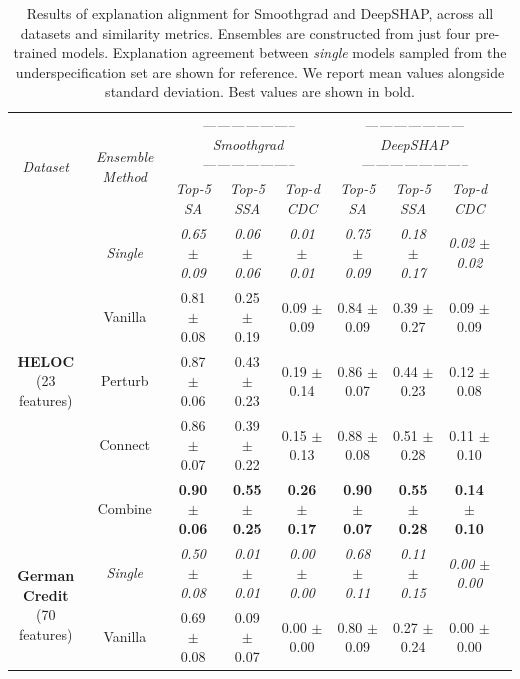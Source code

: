 \begin{table}[t]
\caption{\small Results of explanation alignment for Smoothgrad and DeepSHAP, across all datasets and similarity metrics. Ensembles are constructed from just four pre-trained models. Explanation agreement between \textit{single} models sampled from the underspecification set are shown for reference. We report mean values alongside standard deviation. Best values are shown in bold.}
\label{tab:all_res}
\centering
\fontsize{8}{7}\selectfont
\begin{tabular}{ccccccccc}\toprule
\multirow{2}{*}{\textit{Dataset}} & \multirow{2}{*}{\parbox{0.08\textwidth}{\centering\textit{Ensemble Method}}} & \multicolumn{3}{c}{\textit{-------------------- Smoothgrad --------------------}} & \multicolumn{3}{c}{\textit{--------------------- DeepSHAP -----------------------}} \\
& & \textit{Top-5 SA} & \textit{Top-5 SSA} & \textit{Top-d CDC} & \textit{Top-5 SA} & \textit{Top-5 SSA} & \textit{Top-d CDC} \\\midrule
\multirow{5}{*}{\parbox{0.09\textwidth}{\centering\textbf{HELOC}\\ \scriptsize (23 features)}}
    & \textit{Single} & \textit{0.65 $\pm$ 0.09} & \textit{0.06 $\pm$ 0.06} & \textit{0.01 $\pm$ 0.01} & \textit{0.75 $\pm$ 0.09} & \textit{0.18 $\pm$ 0.17} & \textit{0.02 $\pm$ 0.02} \\
    & Vanilla & 0.81 $\pm$ 0.08 & 0.25 $\pm$ 0.19 & 0.09 $\pm$ 0.09 & 0.84 $\pm$ 0.09 & 0.39 $\pm$ 0.27 & 0.09 $\pm$ 0.09 \\
    & Perturb & 0.87 $\pm$ 0.06 & 0.43 $\pm$ 0.23 & 0.19 $\pm$ 0.14 & 0.86 $\pm$ 0.07 & 0.44 $\pm$ 0.23 & 0.12 $\pm$ 0.08 \\
    & Connect & 0.86 $\pm$ 0.07 & 0.39 $\pm$ 0.22 & 0.15 $\pm$ 0.13 & 0.88 $\pm$ 0.08 & 0.51 $\pm$ 0.28 & 0.11 $\pm$ 0.10 \\
    & Combine & \textbf{0.90 $\pm$ 0.06} & \textbf{0.55 $\pm$ 0.25} & \textbf{0.26 $\pm$ 0.17} & \textbf{0.90 $\pm$ 0.07} & \textbf{0.55 $\pm$ 0.28} & \textbf{0.14 $\pm$ 0.10} \\ \midrule
\multirow{5}{*}{\parbox{0.09\textwidth}{\centering\textbf{German\\Credit}\\ \scriptsize (70 features)}}
    & \textit{Single} & \textit{0.50 $\pm$ 0.08} & \textit{0.01 $\pm$ 0.01} & \textit{0.00 $\pm$ 0.00} & \textit{0.68 $\pm$ 0.11} & \textit{0.11 $\pm$ 0.15} & \textit{0.00 $\pm$ 0.00} \\
    & Vanilla & 0.69 $\pm$ 0.08 & 0.09 $\pm$ 0.07 & 0.00 $\pm$ 0.00 & 0.80 $\pm$ 0.09 & 0.27 $\pm$ 0.24 & 0.00 $\pm$ 0.00 \\

\end{tabular}
\end{table}
